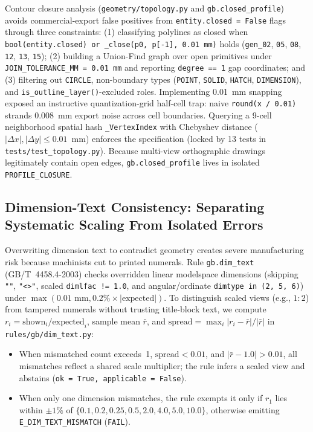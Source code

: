 \documentclass[nocopyright,nolists,upint,varvw,hyphenate]{asmejour}
\begin{document}
Contour closure analysis (\texttt{geometry/\allowbreak topology.py} and \texttt{gb.\allowbreak closed\_\allowbreak profile}) avoids commercial-export false positives from \texttt{entity.closed = False} flags through three constraints: (1) classifying polylines as closed when \texttt{bool(entity.closed) or \_close(p0, p[-1], 0.01~mm)} holds (\texttt{gen\_02}, \texttt{05}, \texttt{08}, \texttt{12}, \texttt{13}, \texttt{15}); (2) building a Union-Find graph over open primitives under \texttt{JOIN\_\allowbreak TOLERANCE\_MM = 0.01~mm} and reporting \texttt{degree == 1} gap coordinates; and (3) filtering out \texttt{CIRCLE}, non-boundary types (\texttt{POINT}, \texttt{SOLID}, \texttt{HATCH}, \texttt{DIMENSION}), and \texttt{is\_outline\_\allowbreak layer()}-excluded roles. Implementing 0.01~mm snapping exposed an instructive quantization-grid half-cell trap: naive \texttt{round(x / 0.01)} strands 0.008~mm export noise across cell boundaries. Querying a 9-cell neighborhood spatial hash \texttt{\_VertexIndex} with Chebyshev distance ($|\Delta x|, |\Delta y| \le 0.01$~mm) enforces the specification (locked by 13 tests in \texttt{tests/\allowbreak test\_\allowbreak topology.py}). Because multi-view orthographic drawings legitimately contain open edges, \texttt{gb.\allowbreak closed\_\allowbreak profile} lives in isolated \texttt{PROFILE\_\allowbreak CLOSURE}.

\subsection{Dimension-Text Consistency: Separating Systematic Scaling From Isolated Errors}\label{sec:dim_text}

Overwriting dimension text to contradict geometry creates severe manufacturing risk because machinists cut to printed numerals. Rule \texttt{gb.dim\_text} (GB/T~4458.4-2003) checks overridden linear modelspace dimensions (skipping \texttt{""}, \texttt{"<>"}, scaled \texttt{dimlfac != 1.0}, and angular/ordinate \texttt{dimtype in (2, 5, 6)}) under $\max(0.01\text{~mm}, 0.2\% \times |\text{expected}|)$. To distinguish scaled views (e.g., $1{:}2$) from tampered numerals without trusting title-block text, we compute $r_i = \text{shown}_i / \text{expected}_i$, sample mean $\bar{r}$, and $\text{spread} = \max_i |r_i - \bar{r}| / |\bar{r}|$ in \texttt{rules/gb/dim\_text.py}:

\begin{itemize}
\item When mismatched count exceeds~1, $\text{spread} < 0.01$, and $|\bar{r} - 1.0| > 0.01$, all mismatches reflect a shared scale multiplier; the rule infers a scaled view and abstains (\texttt{ok = True, applicable = False}).
\item When only one dimension mismatches, the rule exempts it only if $r_1$ lies within $\pm 1\%$ of $\{0.1, 0.2, 0.25, 0.5,\allowbreak 2.0, 4.0, 5.0, 10.0\}$, otherwise emitting \texttt{E\_DIM\_\allowbreak TEXT\_\allowbreak MISMATCH} (\texttt{FAIL}).
\end{itemize}
\end{document}

